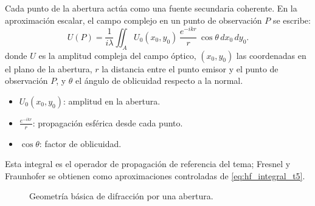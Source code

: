 \documentclass[12pt, a4paper]{article}
\theoremstyle{plain}
\theoremstyle{definition}
\theoremstyle{remark}
\begin{document}
Cada punto de la abertura actúa como una fuente secundaria coherente. En la aproximación
escalar, el campo complejo en un punto de observación $P$ se escribe:
\begin{equation}
  U(P)=\frac{1}{i\lambda}\iint_A
  U_0(x_0,y_0)\,\frac{e^{-ikr}}{r}\,\cos\theta\,dx_0\,dy_0.
  \label{eq:hf_integral_t5}
\end{equation}
donde $U$ es la amplitud compleja del campo óptico, $(x_0,y_0)$ las coordenadas en el plano de la abertura, $r$ la distancia entre el punto emisor y el punto de observación $P$, y $\theta$ el ángulo de oblicuidad respecto a la normal.

\begin{itemize}
  \item $U_0(x_0,y_0)$: amplitud en la abertura.
  \item $\frac{e^{-ikr}}{r}$: propagación esférica desde cada punto.
  \item $\cos\theta$: factor de oblicuidad.
\end{itemize}
Esta integral es el operador de propagación de referencia del tema; Fresnel y
Fraunhofer se obtienen como aproximaciones controladas de
\eqref{eq:hf_integral_t5}.

\begin{figure}[ht]
  \centering
  \caption{Geometría básica de difracción por una abertura.}
  \label{fig:geometria_difraccion_t5}
\end{figure}
\end{document}
